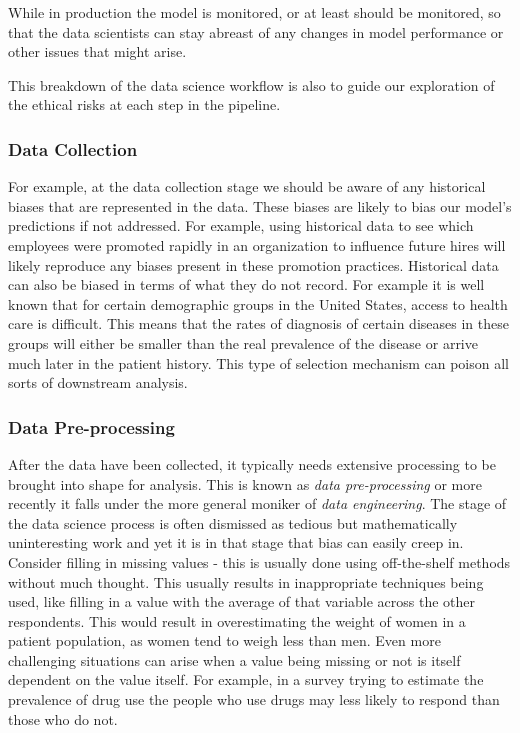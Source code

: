 \documentclass[
]{book}
\theoremstyle{definition}
\theoremstyle{definition}
\theoremstyle{definition}
\theoremstyle{definition}
\theoremstyle{remark}
\begin{document}
While in production the model is monitored, or at least should be monitored, so that the data scientists can stay abreast of any changes in model performance or other issues that might arise.

This breakdown of the data science workflow is also to guide our exploration of the ethical risks at each step in the pipeline.

\hypertarget{data-collection}{%
\subsubsection{Data Collection}\label{data-collection}}

For example, at the data collection stage we should be aware of any historical biases that are represented in the data. These biases are likely to bias our model's predictions if not addressed. For example, using historical data to see which employees were promoted rapidly in an organization to influence future hires will likely reproduce any biases present in these promotion practices. Historical data can also be biased in terms of what they do not record. For example it is well known that for certain demographic groups in the United States, access to health care is difficult. This means that the rates of diagnosis of certain diseases in these groups will either be smaller than the real prevalence of the disease or arrive much later in the patient history. This type of selection mechanism can poison all sorts of downstream analysis.

\hypertarget{data-pre-processing}{%
\subsubsection{Data Pre-processing}\label{data-pre-processing}}

After the data have been collected, it typically needs extensive processing to be brought into shape for analysis. This is known as \emph{data pre-processing} or more recently it falls under the more general moniker of \emph{data engineering}. The stage of the data science process is often dismissed as tedious but mathematically uninteresting work and yet it is in that stage that bias can easily creep in. Consider filling in missing values - this is usually done using off-the-shelf methods without much thought. This usually results in inappropriate techniques being used, like filling in a value with the average of that variable across the other respondents. This would result in overestimating the weight of women in a patient population, as women tend to weigh less than men. Even more challenging situations can arise when a value being missing or not is itself dependent on the value itself. For example, in a survey trying to estimate the prevalence of drug use the people who use drugs may less likely to respond than those who do not.
\end{document}
